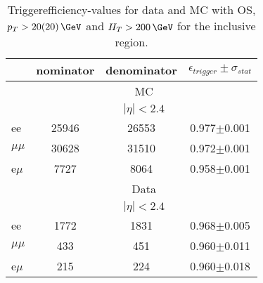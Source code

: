 
\begin{table}[hbp] \caption{Triggerefficiency-values for data and MC with OS, $p_T>20(20)\,\GeV$ and $H_T>200\,\GeV$ for the inclusive region.} 
\centering 
\renewcommand{\arraystretch}{1.2} 
\begin{tabular}{|l|c|c|c|}     
\hline    
 & nominator & denominator & $\epsilon_{trigger} \pm \sigma_{stat}$ \\    
\hline\hline
& \multicolumn{3}{|c|}{MC} \\
\hline
& \multicolumn{3}{|c|}{$|\eta|<2.4$ } \\
\hline 
ee & 25946 & 26553 & 0.977$\pm$0.001 \\
$\mu\mu$ & 30628 & 31510 & 0.972$\pm$0.001 \\
e$\mu$ & 7727 & 8064 & 0.958$\pm$0.001 \\
    
    \hline 
&\multicolumn{3}{|c|}{Data} \\
\hline
& \multicolumn{3}{|c|}{$|\eta|<2.4$ } \\
\hline
ee & 1772 & 1831 & 0.968$\pm$0.005 \\
$\mu\mu$ & 433 & 451 & 0.960$\pm$0.011 \\
e$\mu$ & 215 & 224 & 0.960$\pm$0.018 \\
 
 \hline     
\end{tabular}  
\label{tab:EffValues_Inclusive}
\end{table}
